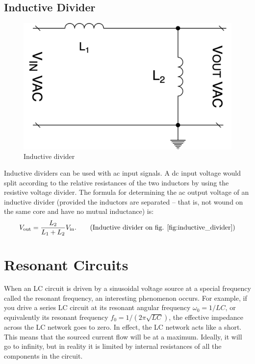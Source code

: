 \documentclass[../../document]{subfiles}
\begin{document}
\subsection{Inductive Divider}
\begin{figure}
	\begin{center}
		\includegraphics[width=\linewidth]{inductive_divider.drawio.png}
	\end{center}
	\caption{Inductive divider}\label{fig:inductive_divider}
\end{figure}
Inductive dividers can be used with ac input signals. A dc input voltage would
split according to the relative resistances of the two inductors by using the
resistive voltage divider. The formula for determining the ac output voltage of
an inductive divider (provided the inductors are separated -- that is, not
wound on the same core and have no mutual inductance) is: \cite{practical_electronics}
\begin{gather}
	V_{\text{out}} = \frac{L_2}{L_1+L_2}V_{\text{in}}. \tag{Inductive divider on
	fig. \ref{fig:inductive_divider}}
\end{gather}

\section{Resonant Circuits}
When an LC circuit is driven by a sinusoidal voltage source at a special
frequency called the resonant frequency, an interesting phenomenon occurs. For
example, if you drive a series LC circuit at its resonant angular frequency
\(\omega_0 =1/LC\), or equivalently its resonant frequency \(f_0 =
1/(2\pi\sqrt{LC})\), the effective impedance across the LC network goes to
zero. In effect, the LC network acts like a short. This means that the sourced
current flow will be at a maximum. Ideally, it will go to infinity, but in
reality it is limited by internal resistances of all the components in the
circuit. \cite{practical_electronics}
\end{document}
